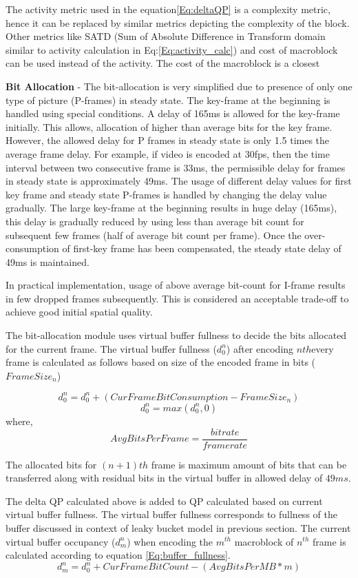 \documentclass[11pt]{article} %
\begin{document}
The activity metric used in the equation\ref{Eq:deltaQP} is a complexity metric, hence it can be replaced by similar metrics depicting the complexity of the block. Other metrics like SATD (Sum of Absolute Difference in Transform domain similar to activity calculation in Eq:\ref{Eq:activity_calc}) and cost of macroblock can be used instead of the activity. The cost of the macroblock is a closest 

\textbf{Bit Allocation} - The bit-allocation is very simplified due to presence of only one type of picture (P-frames) in steady state. The key-frame at the beginning is handled using special conditions.  A delay of 165ms is allowed for the key-frame initially. This allows, allocation of higher than average bits for the key frame. However, the allowed delay for P frames in steady state is only 1.5 times the average frame delay. For example, if video is encoded at 30fps, then the time interval between two consecutive frame is 33ms, the permissible delay for frames in steady state is approximately 49ms. The usage of different delay values for first key frame and steady state P-frames is handled by changing the delay value gradually. The large key-frame at the beginning results in huge delay (165ms), this delay is gradually reduced by using less than average bit count for subsequent few frames (half of average bit count per frame). Once the over-consumption of first-key frame has been compensated, the steady state delay of 49ms is maintained. 

In practical implementation, usage of above average bit-count for I-frame results in few dropped frames subsequently. This is considered an acceptable trade-off to achieve good initial spatial quality.

The bit-allocation module uses virtual buffer fullness to decide the bits allocated for the current frame. The virtual buffer fullness ($d_0^n$) after encoding $nth$every frame is calculated as follows based on size of the encoded frame in bits ($FrameSize_n$)

$$ d_0^n = d_0^n + (CurFrameBitConsumption - FrameSize_n)$$
$$ d_0^n = max(d_0^n , 0) $$
where, $$ AvgBitsPerFrame = \frac{bitrate}{framerate}$$

The allocated bits for $(n+1)th$ frame is maximum amount of bits that can be transferred along with residual bits in the virtual buffer in allowed delay of $49ms$.

	The delta QP calculated above is added to QP calculated based on current virtual buffer fullness. The virtual buffer fullness corresponds to fullness of the buffer discussed in context of leaky bucket model in previous section. The current virtual buffer occupancy ($d_m^n$) when encoding the $m^{th}$ macroblock of $n^{th}$ frame is calculated according to equation \ref{Eq:buffer_fullness}.
\begin{equation}
	\label{Eq:buffer_fullness}
	d_m^n = d_0^n + CurFrameBitCount - (AvgBitsPerMB * m)
\end{equation}	
\end{document}
